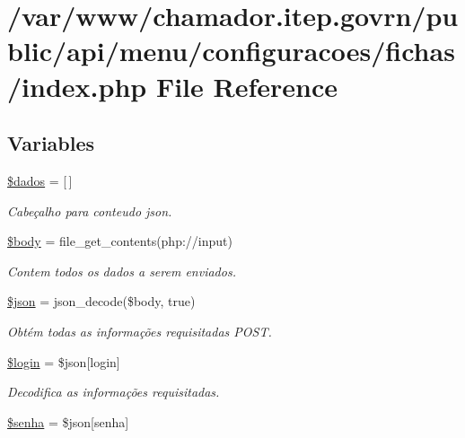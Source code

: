 \hypertarget{menu_2configuracoes_2fichas_2index_8php}{}\section{/var/www/chamador.itep.\+govrn/public/api/menu/configuracoes/fichas/index.php File Reference}
\label{menu_2configuracoes_2fichas_2index_8php}
\subsection*{Variables}
\begin{DoxyCompactItemize}
\item 
\hyperlink{menu_2configuracoes_2fichas_2index_8php_a252370d95039a38fa11afab784725d58}{\$dados} = \mbox{[}$\,$\mbox{]}
\begin{DoxyCompactList}\small\item\em Cabeçalho para conteudo json. \end{DoxyCompactList}\item 
\hyperlink{menu_2configuracoes_2fichas_2index_8php_a26b9f9373f7bb79dfcf8a86dff086b45}{\$body} = file\+\_\+get\+\_\+contents(\textquotesingle{}php\+://input\textquotesingle{})
\begin{DoxyCompactList}\small\item\em Contem todos os dados a serem enviados. \end{DoxyCompactList}\item 
\hyperlink{menu_2configuracoes_2fichas_2index_8php_acedd13b51401130848ce18f4d5c52605}{\$json} = json\+\_\+decode(\$body, true)
\begin{DoxyCompactList}\small\item\em Obtém todas as informações requisitadas P\+O\+ST. \end{DoxyCompactList}\item 
\hyperlink{menu_2configuracoes_2fichas_2index_8php_afc31993e855f9631572adfedcfe6f34b}{\$login} = \$json\mbox{[}\textquotesingle{}login\textquotesingle{}\mbox{]}
\begin{DoxyCompactList}\small\item\em Decodifica as informações requisitadas. \end{DoxyCompactList}\item 
\hyperlink{menu_2configuracoes_2fichas_2index_8php_a3678c8769c9698fd30581c1016c5f475}{\$senha} = \$json\mbox{[}\textquotesingle{}senha\textquotesingle{}\mbox{]}

\end{DoxyCompactItemize}
